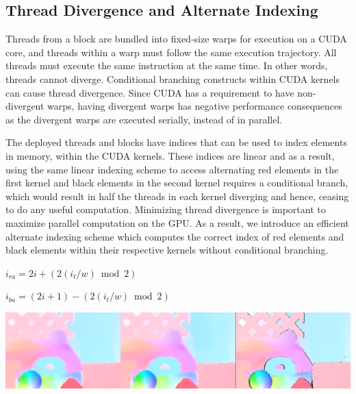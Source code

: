 \documentclass[english]{article}
\begin{document}
	\subsection{Thread Divergence and Alternate Indexing}
	Threads from a block are bundled into fixed-size warps for execution on a CUDA core, and threads within a warp must follow the same execution trajectory. All threads must execute the same instruction at the same time. In other words, threads cannot diverge. Conditional branching constructs within CUDA kernels can cause thread divergence. Since CUDA has a requirement to have non-divergent warps, having divergent warps has negative performance consequences as the divergent warps are executed serially, instead of in parallel.\newline

	The deployed threads and blocks have indices that can be used to index elements in memory, within the CUDA kernels. These indices are linear and as a result, using the same linear indexing scheme to access alternating red elements in the first kernel and black elements in the second kernel requires a conditional branch, which would result in half the threads in each kernel diverging and hence, ceasing to do any useful computation. Minimizing thread divergence is important to maximize parallel computation on the GPU. As a result, we introduce an efficient alternate indexing scheme which computes the correct index of red elements and black elements within their respective kernels without conditional branching.\newline

	\begin{center}	
	$i_{ra} = 2i + (2(i_t/w) \bmod 2)$
	\end{center}

	\begin{center}	
	$i_{ba} = (2i+1) - (2(i_t/w) \bmod 2)$
	\end{center}

	\begin{center}
	\includegraphics[width=170mm]{results/images/3_cpu_gpu_gt.png}
	\end{center}
	
\end{document}
